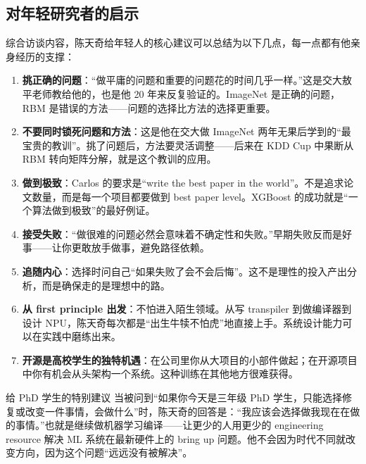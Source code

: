 \subsection{对年轻研究者的启示}

综合访谈内容，陈天奇给年轻人的核心建议可以总结为以下几点，每一点都有他亲身经历的支撑：

\begin{enumerate}
    \item \textbf{挑正确的问题}：``做平庸的问题和重要的问题花的时间几乎一样。''这是交大敖平老师教给他的，也是他 20 年来反复验证的。ImageNet 是正确的问题，RBM 是错误的方法------问题的选择比方法的选择更重要。

    \item \textbf{不要同时锁死问题和方法}：这是他在交大做 ImageNet 两年无果后学到的``最宝贵的教训''。挑了问题后，方法要灵活调整------后来在 KDD Cup 中果断从 RBM 转向矩阵分解，就是这个教训的应用。

    \item \textbf{做到极致}：Carlos 的要求是``write the best paper in the world''。不是追求论文数量，而是每一个项目都要做到 best paper level。XGBoost 的成功就是``一个算法做到极致''的最好例证。

    \item \textbf{接受失败}：``做很难的问题必然会意味着不确定性和失败。''早期失败反而是好事------让你更敢放手做事，避免路径依赖。

    \item \textbf{追随内心}：选择时问自己``如果失败了会不会后悔''。这不是理性的投入产出分析，而是确保走的是理想中的路。

    \item \textbf{从 first principle 出发}：不怕进入陌生领域。从写 transpiler 到做编译器到设计 NPU，陈天奇每次都是``出生牛犊不怕虎''地直接上手。系统设计能力可以在实践中磨练出来。

    \item \textbf{开源是高校学生的独特机遇}：在公司里你从大项目的小部件做起；在开源项目中你有机会从头架构一个系统。这种训练在其他地方很难获得。
\end{enumerate}

\begin{knowledgebox}{给 PhD 学生的特别建议}
当被问到``如果你今天是三年级 PhD 学生，只能选择修复或改变一件事情，会做什么''时，陈天奇的回答是：``我应该会选择做我现在在做的事情。''也就是继续做机器学习编译------让更少的人用更少的 engineering resource 解决 ML 系统在最新硬件上的 bring up 问题。他不会因为时代不同就改变方向，因为这个问题``远远没有被解决''。
\end{knowledgebox}

